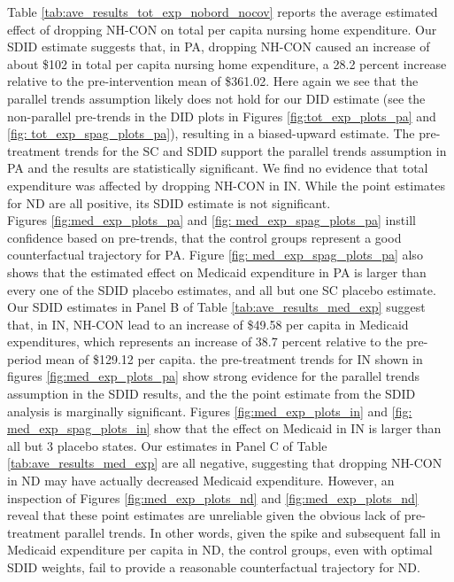\documentclass[../Main.tex]{subfiles}
\begin{document}
\indent Table \ref{tab:ave_results_tot_exp_nobord_nocov} reports the average estimated effect of dropping NH-CON on total per capita nursing home expenditure. Our SDID estimate suggests that, in PA, dropping NH-CON caused an increase of about \$102 in total per capita nursing home expenditure, a 28.2 percent increase relative to the pre-intervention mean of \$361.02. Here again we see that the parallel trends assumption likely does not hold for our DID estimate (see the non-parallel pre-trends in the DID plots in Figures \ref{fig:tot_exp_plots_pa} and \ref{fig: tot_exp_spag_plots_pa}), resulting in a biased-upward estimate. The pre-treatment trends for the SC and SDID support the parallel trends assumption in PA and the results are statistically significant. We find no evidence that total expenditure was affected by dropping NH-CON in IN. While the point estimates for ND are all positive, its SDID estimate is not significant.\\
\indent  Figures \ref{fig:med_exp_plots_pa} and \ref{fig: med_exp_spag_plots_pa} instill confidence based on pre-trends, that the control groups represent a good counterfactual trajectory for PA. Figure \ref{fig: med_exp_spag_plots_pa} also shows that the estimated effect on Medicaid expenditure in PA is larger than every one of the SDID placebo estimates, and all but one SC placebo estimate. Our SDID estimates in Panel B of Table \ref{tab:ave_results_med_exp} suggest that, in IN, NH-CON lead to an increase of \$49.58 per capita in Medicaid expenditures, which represents an increase of 38.7 percent relative to the pre-period mean of \$129.12 per capita. the pre-treatment trends for IN shown in figures \ref{fig:med_exp_plots_pa} show strong evidence for the parallel trends assumption in the SDID results, and the the point estimate from the SDID analysis is marginally significant. Figures \ref{fig:med_exp_plots_in} and \ref{fig: med_exp_spag_plots_in} show that the effect on Medicaid in IN is larger than all but 3 placebo states. Our estimates in Panel C of Table \ref{tab:ave_results_med_exp} are all negative, suggesting that dropping NH-CON in ND may have actually decreased Medicaid expenditure. However, an inspection of Figures \ref{fig:med_exp_plots_nd} and \ref{fig:med_exp_plots_nd} reveal that these point estimates are unreliable given the obvious lack of pre-treatment parallel trends. In other words, given the spike and subsequent fall in Medicaid expenditure per capita in ND, the control groups, even with optimal SDID weights, fail to provide a reasonable counterfactual trajectory for ND.
\end{document}

